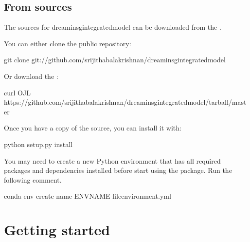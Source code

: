 \documentclass[letterpaper,10pt,english]{sphinxmanual}
\begin{document}
\section{From sources}
\label{\detokenize{installation:from-sources}}
\sphinxAtStartPar
The sources for dreaminsg\sphinxhyphen{}integrated\sphinxhyphen{}model can be downloaded from the .

\sphinxAtStartPar
You can either clone the public repository:

\begin{sphinxVerbatim}[commandchars=\\\{\}]
git clone git://github.com/srijithabalakrishnan/dreaminsg\PYGZus{}integrated\PYGZus{}model
\end{sphinxVerbatim}

\sphinxAtStartPar
Or download the :

\begin{sphinxVerbatim}[commandchars=\\\{\}]
curl \PYGZhy{}OJL https://github.com/srijithabalakrishnan/dreaminsg\PYGZus{}integrated\PYGZus{}model/tarball/master
\end{sphinxVerbatim}

\sphinxAtStartPar
Once you have a copy of the source, you can install it with:

\begin{sphinxVerbatim}[commandchars=\\\{\}]
python setup.py install
\end{sphinxVerbatim}

\sphinxAtStartPar
You may need to create a new Python environment that has all required packages and dependencies installed before start using the package.
Run the following comment.

\begin{sphinxVerbatim}[commandchars=\\\{\}]
conda env create \PYGZhy{}\PYGZhy{}name ENV\PYGZus{}NAME \PYGZhy{}\PYGZhy{}fileenvironment.yml
\end{sphinxVerbatim}


\chapter{Getting started}
\label{\detokenize{use:getting-started}}\label{\detokenize{use::doc}}
\end{document}
